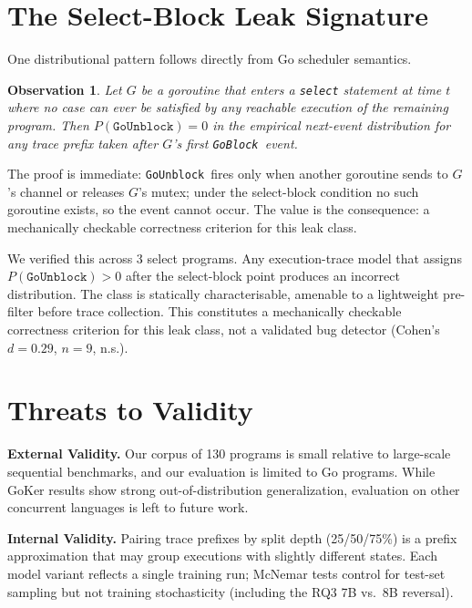 \documentclass[10pt,conference]{IEEEtran}
\newcommand{\eblock}{\texttt{GoBlock}}
\newcommand{\eunblock}{\texttt{GoUnblock}}
\newtheorem{observation}{Observation}
\begin{document}
\section{The Select-Block Leak Signature}\label{sec:signature}

One distributional pattern follows directly from Go scheduler semantics.

\begin{observation}\label{prop:select}
Let $G$ be a goroutine that enters a \texttt{select} statement at time
$t$ where no case can ever be satisfied by any reachable execution of
the remaining program.
Then $P(\eunblock){=}0$ in the empirical next-event distribution for
any trace prefix taken after $G$'s first \eblock\ event.
\end{observation}

The proof is immediate: \eunblock\ fires only when another goroutine sends to $G$'s channel or releases $G$'s mutex; under the select-block condition no such goroutine exists, so the event cannot occur. The value is the consequence: a mechanically checkable correctness criterion for this leak class.

We verified this across 3 select programs. Any execution-trace model that assigns $P(\eunblock){>}0$ after the select-block point produces an incorrect distribution. The class is statically characterisable, amenable to a lightweight pre-filter before trace collection. This constitutes a mechanically checkable correctness criterion for this leak class, not a validated bug detector (Cohen's $d{=}0.29$, $n{=}9$, n.s.).

\section{Threats to Validity}\label{sec:threats}

\textbf{External Validity.} Our corpus of 130 programs is small relative to large-scale sequential benchmarks, and our evaluation is limited to Go programs. While GoKer results show strong out-of-distribution generalization, evaluation on other concurrent languages is left to future work.

\textbf{Internal Validity.} Pairing trace prefixes by split depth (25/50/75\%) is a prefix approximation that may group executions with slightly different states. Each model variant reflects a single training run; McNemar tests control for test-set sampling but not training stochasticity (including the RQ3 7B vs.\ 8B reversal).
\end{document}
